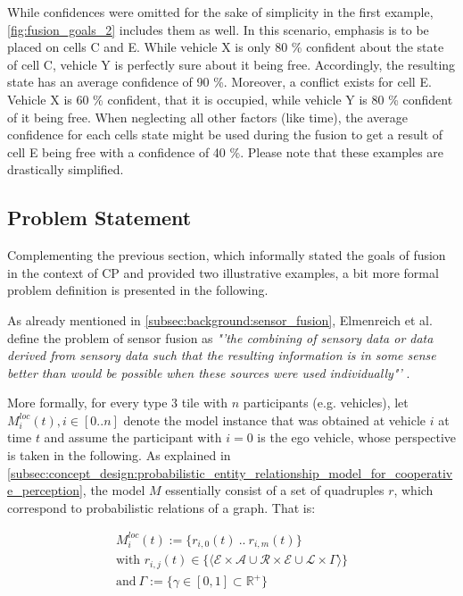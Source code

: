 While confidences were omitted for the sake of simplicity in the first example, \autoref{fig:fusion_goals_2} includes them as well. In this scenario, emphasis is to be placed on cells C and E. While vehicle X is only 80 \% confident about the state of cell C, vehicle Y is perfectly sure about it being free. Accordingly, the resulting state has an average confidence of 90 \%. Moreover, a conflict exists for cell E. Vehicle X is 60 \% confident, that it is occupied, while vehicle Y is 80 \% confident of it being free. When neglecting all other factors (like time), the average confidence for each cells state might be used during the fusion to get a result of cell E being free with a confidence of 40 \%. Please note that these examples are drastically simplified.

\subsection{Problem Statement}
\label{subsec:concept_design:fusion_problem_statement}
Complementing the previous section, which informally stated the goals of fusion in the context of CP and provided two illustrative examples, a bit more formal problem definition is presented in the following.

As already mentioned in \autoref{subsec:background:sensor_fusion}, Elmenreich et al. define the problem of sensor fusion as \textit{"'the combining of sensory data or data derived from sensory data such that the resulting information is in some sense better than would be possible when these sources were used individually"'} \cite{Elmenreich2002}.
\par
\bigskip

More formally, for every type 3 tile with $n$ participants (e.g. vehicles), let $M^{loc}_i(t), i \in [0..n]$ denote the model instance that was obtained at vehicle $i$ at time $t$ and assume the participant with $i = 0$ is the ego vehicle, whose perspective is taken in the following. As explained in \autoref{subsec:concept_design:probabilistic_entity_relationship_model_for_cooperative_perception}, the model $M$ essentially consist of a set of quadruples $r$, which correspond to probabilistic relations of a graph. That is:

\begin{gather*}
	M^{loc}_i(t) := \{r_{i,0}(t) \ .. \ r_{i,m}(t)\} \\ 
	\text{with\ } r_{i,j}(t) \in \{ \langle \mathcal{E} \times \mathcal{A} \cup \mathcal{R} \times \mathcal{E} \cup \mathcal{L} \times \Gamma \rangle \} \\
	\text{and} \  \Gamma := \{ \gamma \in [0, 1] \subset \mathbb{R}^+ \} \\
\end{gather*}


